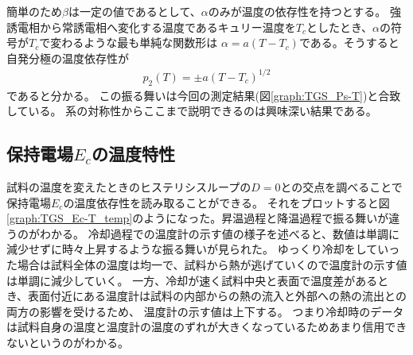 \documentclass[11pt,dvipdfmx,a4paper]{jsarticle}
\begin{document}
簡単のため\(\beta\)は一定の値であるとして、\(\alpha\)のみが温度の依存性を持つとする。
強誘電相から常誘電相へ変化する温度であるキュリー温度を\(T_c\)としたとき、\(\alpha\)の符号が\(T_c\)で変わるような最も単純な関数形は
\(\alpha = a(T-T_c)\)である。そうすると自発分極の温度依存性が
\begin{align}
    p_2(T) = \pm a(T-T_c)^{1/2}
\end{align}
であると分かる。
この振る舞いは今回の測定結果(図\ref{graph:TGS_Ps-T})と合致している。
系の対称性からここまで説明できるのは興味深い結果である。

\subsection{保持電場\(E_c\)の温度特性}
試料の温度を変えたときのヒステリシスループの\(D=0\)との交点を調べることで保持電場\(E_c\)の温度依存性を読み取ることができる。
それをプロットすると図\ref{graph:TGS_Ec-T_temp}のようになった。昇温過程と降温過程で振る舞いが違うのがわかる。
冷却過程での温度計の示す値の様子を述べると、数値は単調に減少せずに時々上昇するような振る舞いが見られた。
ゆっくり冷却をしていった場合は試料全体の温度は均一で、試料から熱が逃げていくので温度計の示す値は単調に減少していく。
一方、冷却が速く試料中央と表面で温度差があるとき、表面付近にある温度計は試料の内部からの熱の流入と外部への熱の流出との両方の影響を受けるため、
温度計の示す値は上下する。
つまり冷却時のデータは試料自身の温度と温度計の温度のずれが大きくなっているためあまり信用できないというのがわかる。
\end{document}
